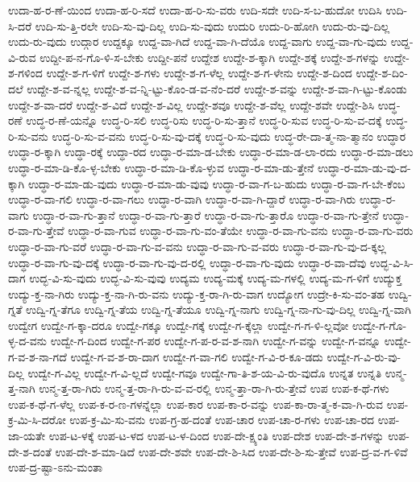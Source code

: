 {ಉದಾ-ಹ-ರ-ಣೆ-ಯಿಂದ
ಉದಾ-ಹ-ರಿ-ಸದೆ
ಉದಾ-ಹ-ರಿ-ಸು-ವರು
ಉದಿ-ಸದೇ
ಉದಿ-ಸ-ಬ-ಹುದೋ
ಉದಿಸಿ
ಉದಿ-ಸಿ-ದರೆ
ಉದಿ-ಸು-ತ್ತಿ-ರಲೇ
ಉದಿ-ಸು-ವು-ದಿಲ್ಲ
ಉದಿ-ಸು-ವುದು
ಉದುರಿ
ಉದು-ರಿ-ಹೋಗಿ
ಉದು-ರು-ವು-ದಿಲ್ಲ
ಉದು-ರು-ವುದು
ಉದ್ಗಾರ
ಉದ್ದಕ್ಕೂ
ಉದ್ದ-ವಾ-ಗಿದೆ
ಉದ್ದ-ವಾ-ಗಿ-ದೆಯೊ
ಉದ್ದ-ವಾಗು
ಉದ್ದ-ವಾ-ಗು-ವುದು
ಉದ್ದ-ವಿ-ರುವ
ಉದ್ದೀ-ಪ-ನ-ಗೊ-ಳಿ-ಸ-ಬೇಕು
ಉದ್ದೀ-ಪನೆ
ಉದ್ದೇಶ
ಉದ್ದೇ-ಶ-ಕ್ಕಾಗಿ
ಉದ್ದೇ-ಶಕ್ಕೆ
ಉದ್ದೇ-ಶ-ಗಳನ್ನು
ಉದ್ದೇ-ಶ-ಗಳಿಂದ
ಉದ್ದೇ-ಶ-ಗ-ಳಿಗೆ
ಉದ್ದೇ-ಶ-ಗಳು
ಉದ್ದೇ-ಶ-ಗ-ಳೆಲ್ಲ
ಉದ್ದೇ-ಶ-ಗ-ಳೇನು
ಉದ್ದೇ-ಶ-ದಿಂದ
ಉದ್ದೇ-ಶ-ದಿಂ-ದಲೆ
ಉದ್ದೇ-ಶ-ವ-ನ್ನಲ್ಲ
ಉದ್ದೇ-ಶ-ವ-ನ್ನಿ-ಟ್ಟು-ಕೊಂ-ಡ-ವ-ನೆಂ-ದರೆ
ಉದ್ದೇ-ಶ-ವನ್ನು
ಉದ್ದೇ-ಶ-ವಾ-ಗಿ-ಟ್ಟು-ಕೊಂಡು
ಉದ್ದೇ-ಶ-ವಾ-ದರೆ
ಉದ್ದೇ-ಶ-ವಿದೆ
ಉದ್ದೇ-ಶ-ವಿಲ್ಲ
ಉದ್ದೇ-ಶವೂ
ಉದ್ದೇ-ಶ-ವೆಲ್ಲ
ಉದ್ದೇ-ಶವೇ
ಉದ್ದೇ-ಶಿಸಿ
ಉದ್ಧ-ರಣೆ
ಉದ್ಧ-ರ-ಣೆ-ಯನ್ನೊ
ಉದ್ಧ-ರಿ-ಸಲಿ
ಉದ್ಧ-ರಿಸು
ಉದ್ಧ-ರಿ-ಸು-ತ್ತಾನೆ
ಉದ್ಧ-ರಿ-ಸುವ
ಉದ್ಧ-ರಿ-ಸು-ವ-ದಕ್ಕೆ
ಉದ್ಧ-ರಿ-ಸು-ವನು
ಉದ್ಧ-ರಿ-ಸು-ವ-ವನು
ಉದ್ಧ-ರಿ-ಸು-ವು-ದಕ್ಕೆ
ಉದ್ಧ-ರಿ-ಸು-ವುದು
ಉದ್ಧ-ರೇ-ದಾ-ತ್ಮ-ನಾ-ತ್ಮಾನಂ
ಉದ್ಧಾರ
ಉದ್ಧಾ-ರ-ಕ್ಕಾಗಿ
ಉದ್ಧಾ-ರಕ್ಕೆ
ಉದ್ಧಾ-ರದ
ಉದ್ಧಾ-ರ-ಮಾ-ಡ-ಬೇಕು
ಉದ್ಧಾ-ರ-ಮಾ-ಡ-ಲಾ-ರದು
ಉದ್ಧಾ-ರ-ಮಾ-ಡಲು
ಉದ್ಧಾ-ರ-ಮಾ-ಡಿ-ಕೊ-ಳ್ಳ-ಬೇಕು
ಉದ್ಧಾ-ರ-ಮಾ-ಡಿ-ಕೊ-ಳ್ಳುವ
ಉದ್ಧಾ-ರ-ಮಾ-ಡು-ತ್ತೇನೆ
ಉದ್ಧಾ-ರ-ಮಾ-ಡು-ವು-ದ-ಕ್ಕಾಗಿ
ಉದ್ಧಾ-ರ-ಮಾ-ಡು-ವುದು
ಉದ್ಧಾ-ರ-ಮಾ-ಡು-ವುವು
ಉದ್ಧಾ-ರ-ವಾ-ಗ-ಬ-ಹುದು
ಉದ್ಧಾ-ರ-ವಾ-ಗ-ಬೇ-ಕೆಂಬ
ಉದ್ಧಾ-ರ-ವಾ-ಗಲಿ
ಉದ್ಧಾ-ರ-ವಾ-ಗಲು
ಉದ್ಧಾ-ರ-ವಾಗಿ
ಉದ್ಧಾ-ರ-ವಾ-ಗಿ-ದ್ದಾರೆ
ಉದ್ಧಾ-ರ-ವಾ-ಗಿರು
ಉದ್ಧಾ-ರ-ವಾಗು
ಉದ್ಧಾ-ರ-ವಾ-ಗು-ತ್ತಾನೆ
ಉದ್ಧಾ-ರ-ವಾ-ಗು-ತ್ತಾರೆ
ಉದ್ಧಾ-ರ-ವಾ-ಗು-ತ್ತಾರೊ
ಉದ್ಧಾ-ರ-ವಾ-ಗು-ತ್ತೇನೆ
ಉದ್ಧಾ-ರ-ವಾ-ಗು-ತ್ತೇವೆ
ಉದ್ಧಾ-ರ-ವಾ-ಗುವ
ಉದ್ಧಾ-ರ-ವಾ-ಗು-ವಂ-ತೆಯೇ
ಉದ್ಧಾ-ರ-ವಾ-ಗು-ವನು
ಉದ್ಧಾ-ರ-ವಾ-ಗು-ವರು
ಉದ್ಧಾ-ರ-ವಾ-ಗು-ವರೆ
ಉದ್ಧಾ-ರ-ವಾ-ಗು-ವ-ವನು
ಉದ್ಧಾ-ರ-ವಾ-ಗು-ವ-ವರು
ಉದ್ಧಾ-ರ-ವಾ-ಗು-ವು-ದ-ಕ್ಕಲ್ಲ
ಉದ್ಧಾ-ರ-ವಾ-ಗು-ವು-ದಕ್ಕೆ
ಉದ್ಧಾ-ರ-ವಾ-ಗು-ವು-ದ-ರಲ್ಲಿ
ಉದ್ಧಾ-ರ-ವಾ-ಗು-ವುದು
ಉದ್ಧಾ-ರ-ವಾ-ದೆವು
ಉದ್ಭ-ವಿ-ಸಿ-ದಾಗ
ಉದ್ಭ-ವಿ-ಸು-ವುದು
ಉದ್ಭ-ವಿ-ಸು-ವುವು
ಉದ್ಯಮ
ಉದ್ಯ-ಮಕ್ಕೆ
ಉದ್ಯ-ಮ-ಗಳಲ್ಲಿ
ಉದ್ಯ-ಮ-ಗ-ಳಿಗೆ
ಉದ್ಯುಕ್ತ
ಉದ್ಯು-ಕ್ತ-ನಾ-ಗಿರು
ಉದ್ಯು-ಕ್ತ-ನಾ-ಗಿ-ರು-ವನು
ಉದ್ಯು-ಕ್ತ-ರಾ-ಗಿ-ರು-ವಾಗ
ಉದ್ಯೋಗ
ಉದ್ರೇ-ಕಿ-ಸು-ವಂ-ತಹ
ಉದ್ವಿ-ಗ್ನತೆ
ಉದ್ವಿ-ಗ್ನ-ತೆಗೂ
ಉದ್ವಿ-ಗ್ನ-ತೆಯ
ಉದ್ವಿ-ಗ್ನ-ತೆಯೂ
ಉದ್ವಿ-ಗ್ನ-ನಾಗು
ಉದ್ವಿ-ಗ್ನ-ನಾ-ಗು-ವು-ದಿಲ್ಲ
ಉದ್ವಿ-ಗ್ನ-ವಾಗಿ
ಉದ್ವೇಗ
ಉದ್ವೇ-ಗ-ಕ್ಕಾ-ದರೂ
ಉದ್ವೇ-ಗಕ್ಕೂ
ಉದ್ವೇ-ಗಕ್ಕೆ
ಉದ್ವೇ-ಗ-ಕ್ಕೆಲ್ಲಾ
ಉದ್ವೇ-ಗ-ಗ-ಳಿ-ಲ್ಲವೋ
ಉದ್ವೇ-ಗ-ಗೊ-ಳ್ಳ-ದ-ವನು
ಉದ್ವೇ-ಗ-ದಿಂದ
ಉದ್ವೇ-ಗ-ಪರ
ಉದ್ವೇ-ಗ-ಪ-ರ-ವ-ಶ-ನಾಗಿ
ಉದ್ವೇ-ಗ-ವನ್ನು
ಉದ್ವೇ-ಗ-ವನ್ನೂ
ಉದ್ವೇ-ಗ-ವ-ಶ-ನಾ-ಗದೆ
ಉದ್ವೇ-ಗ-ವ-ಶ-ರಾ-ದಾಗ
ಉದ್ವೇ-ಗ-ವಾ-ಗಲಿ
ಉದ್ವೇ-ಗ-ವಿ-ರ-ಕೂ-ಡದು
ಉದ್ವೇ-ಗ-ವಿ-ರು-ವು-ದಿಲ್ಲ
ಉದ್ವೇ-ಗ-ವಿಲ್ಲ
ಉದ್ವೇ-ಗ-ವಿ-ಲ್ಲದೆ
ಉದ್ವೇ-ಗವೂ
ಉದ್ವೇ-ಗಾ-ತಿ-ಶ-ಯ-ವಿ-ರು-ವುದೊ
ಉನ್ನತ
ಉನ್ನತಿ
ಉನ್ಮ-ತ್ತ-ನಾಗಿ
ಉನ್ಮ-ತ್ತ-ರಾ-ಗಿರು
ಉನ್ಮ-ತ್ತ-ರಾ-ಗಿ-ರು-ವ-ವ-ರಲ್ಲಿ
ಉನ್ಮ-ತ್ತಾ-ರಾ-ಗಿ-ರು-ತ್ತೇವೆ
ಉಪ
ಉಪ-ಕ-ಥೆ-ಗಳು
ಉಪ-ಕ-ಥೆ-ಗ-ಳೆಲ್ಲ
ಉಪ-ಕ-ರ-ಣ-ಗಳನ್ನೆಲ್ಲಾ
ಉಪ-ಕಾರ
ಉಪ-ಕಾ-ರ-ವನ್ನು
ಉಪ-ಕಾ-ರಾ-ತ್ಮ-ಕ-ವಾ-ಗಿ-ರುವ
ಉಪ-ಕ್ರ-ಮಿ-ಸಿ-ದರೋ
ಉಪ-ಕ್ರ-ಮಿ-ಸು-ವನು
ಉಪ-ಗ್ರ-ಹ-ದಂತೆ
ಉಪ-ಚಾರ
ಉಪ-ಚಾ-ರ-ಗಳು
ಉಪ-ಚಾ-ರದ
ಉಪ-ಜಾ-ಯತೇ
ಉಪ-ಟ-ಳಕ್ಕೆ
ಉಪ-ಟ-ಳದ
ಉಪ-ಟ-ಳ-ದಿಂದ
ಉಪ-ದೇ-ಕ್ಷ್ಯಂತಿ
ಉಪ-ದೇಶ
ಉಪ-ದೇ-ಶ-ಗಳನ್ನು
ಉಪ-ದೇ-ಶ-ದಂತೆ
ಉಪ-ದೇ-ಶ-ಮಾ-ಡಿದೆ
ಉಪ-ದೇ-ಶವೇ
ಉಪ-ದೇ-ಶಿ-ಸಿದ
ಉಪ-ದೇ-ಶಿ-ಸು-ತ್ತೇವೆ
ಉಪ-ದ್ರ-ವ-ಗ-ಳಿವೆ
ಉಪ-ದ್ರ-ಷ್ಟಾ-ಽನು-ಮಂತಾ
}
